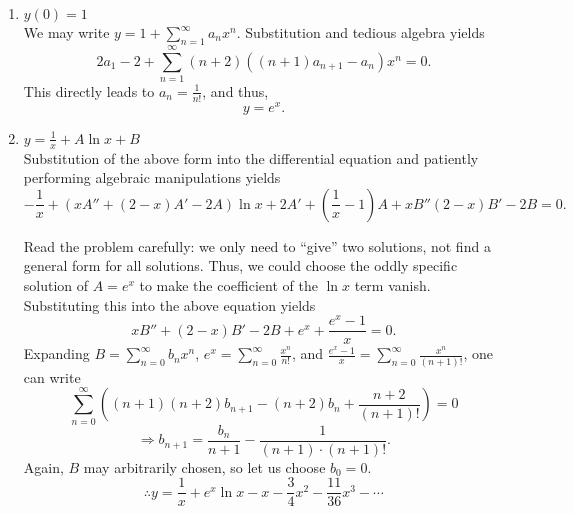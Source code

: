 \item
\begin{enumerate}[wide, labelindent = 0pt, label = (\roman*)]
	\item $y(0) = 1$ \\
	      We may write $y = 1 + \sum_{n=1}^\infty a_n x^n$.
	      Substitution and tedious algebra yields
	      \[
		      2a_1 - 2 + \sum_{n=1}^\infty (n + 2) ((n + 1)a_{n + 1} - a_n) x^n = 0.
	      \]
	      This directly leads to $a_n = \frac{1}{n!}$, and thus,
	      \[
		      y = e^x.
	      \]

	\item $y = \frac{1}{x} + A \ln x + B$ \\
	      Substitution of the above form into the differential equation and patiently performing algebraic manipulations yields
	      \[
		      -\frac{1}{x} + (xA'' + (2 - x)A' - 2A)\ln x + 2A' + \left( \frac{1}{x} - 1 \right) A + xB'' (2 - x) B' - 2B = 0.
	      \]

	      Read the problem carefully: we only need to ``give'' two solutions, not find a general form for all solutions.
	      Thus, we could choose the oddly specific solution of $A = e^x$ to make the coefficient of the $\ln x$ term vanish.
	      Substituting this into the above equation yields
	      \[
		      xB'' + (2 - x)B' - 2B + e^x + \frac{e^x - 1}{x} = 0.
	      \]
	      Expanding $B = \sum_{n=0}^\infty b_n x^n$, $e^x = \sum_{n=0}^\infty \frac{x^n}{n!}$, and $\frac{e^x - 1}{x} = \sum_{n=0}^\infty \frac{x^n}{(n + 1)!}$,
	      one can write
	      \[
		      \sum_{n=0}^\infty \left(
		      (n + 1)(n + 2) b_{n + 1}- (n + 2) b_n + \frac{n + 2}{(n + 1)!}
		      \right) = 0
	      \]
	      \[
		      \Rightarrow b_{n + 1} = \frac{b_n}{n + 1} - \frac{1}{(n + 1) \cdot (n + 1)!}.
	      \]
	      Again, $B$ may arbitrarily chosen, so let us choose $b_0 = 0$.
	      \[
		      \therefore y = \frac{1}{x} + e^x \ln x -x - \frac{3}{4}x^2 - \frac{11}{36}x^3 - \cdots
	      \]
\end{enumerate}